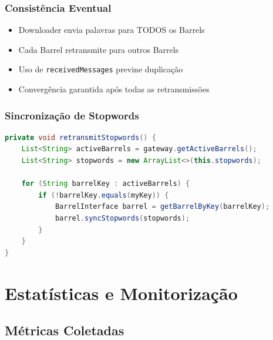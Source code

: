\documentclass[12pt,a4paper]{article}
\begin{document}
\subsubsection{Consistência Eventual}
\begin{itemize}
    \item Downloader envia palavras para TODOS os Barrels
    \item Cada Barrel retransmite para outros Barrels
    \item Uso de \texttt{receivedMessages} previne duplicação
    \item Convergência garantida após todas as retransmissões
\end{itemize}

\subsubsection{Sincronização de Stopwords}
\begin{lstlisting}[language=Java, caption={Sincronização de stopwords}]
private void retransmitStopwords() {
    List<String> activeBarrels = gateway.getActiveBarrels();
    List<String> stopwords = new ArrayList<>(this.stopwords);
    
    for (String barrelKey : activeBarrels) {
        if (!barrelKey.equals(myKey)) {
            BarrelInterface barrel = getBarrelByKey(barrelKey);
            barrel.syncStopwords(stopwords);
        }
    }
}
\end{lstlisting}

\newpage

\section{Estatísticas e Monitorização}

\subsection{Métricas Coletadas}
\end{document}
